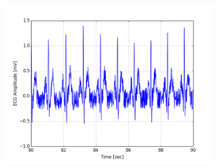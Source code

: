 \documentclass[paper=a4, fontsize=11pt]{scrartcl}
\numberwithin{equation}{section}		%
\numberwithin{figure}{section}			%
\numberwithin{table}{section}		    %
\begin{document}
\begin{appendices}
\begin{figure}[H]
\begin{subfigure}[b]{0.3\textwidth}
		\includegraphics[width=\textwidth]{sim/ecg_9}
	\end{subfigure}
\end{figure}


\end{appendices}
\end{document}
